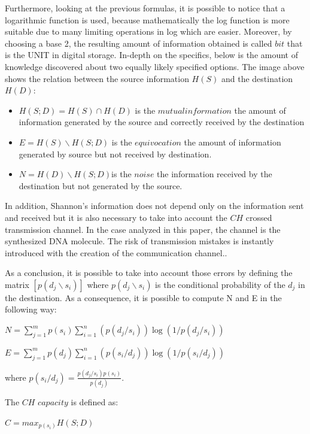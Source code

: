 \documentclass[10pt,twocolumn,twoside]{gsajnl}
\theoremstyle{definition}
\begin{document}
Furthermore, looking at the previous formulas, it is possible to notice that a logarithmic function is used, because mathematically the log function is more suitable due to many limiting operations in log which are easier. Moreover, by choosing a base 2, the resulting amount of information obtained is called $bit$ that is the UNIT in digital storage.
In-depth on the specifics, below is the amount of knowledge discovered about two equally likely specified options.
The image above shows the relation between the source information $H(S)$ and the destination $H(D)$:
\begin{itemize}
    \item $H(S;D)=H(S) \cap H(D)$ is the $mutual information$ the amount of information generated by the source and correctly received by the destination
    \item $E=H(S) \backslash H(S;D)$ is the $equivocation$ the amount of information generated by source but not received by destination.
    \item $N=H(D) \backslash H(S;D)$is the $noise$ the information received by the destination but not generated by the source.
\end{itemize}

In addition, Shannon's information does not depend only on the information sent and received but it is also necessary to take into account the $CH$ crossed transmission channel. In the case analyzed in this paper, the channel is the synthesized DNA molecule. The risk of transmission mistakes is instantly introduced with the creation of the communication channel..

As a conclusion, it is possible to take into account those errors by defining the matrix $[p(d_{j}\backslash s_{i})]$ where $p(d_{j}\backslash s_{i})$ is the conditional probability of the $d_{j}$ in the destination. As a consequence, it is possible to compute N and E in the following way:
\begin{center}
$ N = \sum_{j = 1}^{m} p(s_{i}) \sum_{i = 1}^{n} (p(d_{j}/s_{i})) \log(1/p(d_{j}/s_{i}))$
\end{center}
\begin{center}
$ E = \sum_{j = 1}^{m} p(d_{j}) \sum_{i = 1}^{n} (p(s_{i}/d_{j})) \log(1/p(s_{i}/d_{j}))$
\end{center}
where $p(s_{i}/d_{j}) = \frac{p(d_{j}/s_{i})p(s_{i})}{p(d_{j})}$.

The $CH$ $capacity$ is defined as: 
\begin{center}
    $C = max_{p(s_{i})}{H(S;D)}$
\end{center}
\end{document}
